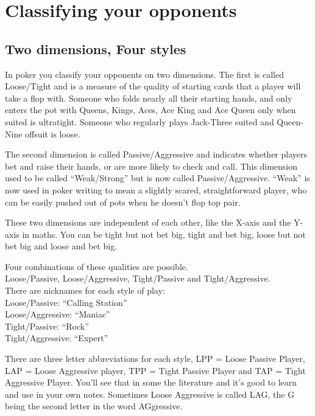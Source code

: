 \chapter{Classifying your opponents}


\section{Two dimensions, Four styles}

In poker you classify your opponents on two dimensions.
The first is called Loose/Tight and is a measure of the quality
of starting cards that a player will take a flop with. Someone
who folds nearly all their starting hands, and
only enters the pot with Queens, Kings, Aces, Ace King and
Ace Queen only when suited is ultratight. Someone who regularly plays
Jack-Three suited and Queen-Nine offsuit is loose.

The second dimension is called Passive/Aggressive and indicates
whether players bet and raise their hands, or are more likely
to check and call. This dimension used to be called ``Weak/Strong''
but is now called Passive/Aggressive. ``Weak'' is now used in poker
writing to mean a slightly scared, straightforward player, who can be
easily pushed out of pots when he doesn't flop top pair.

These two dimensions are independent of each other, like the X-axis
and the Y-axis in maths. You can be tight but not bet big, tight
and bet big, loose but not bet big and loose and bet big.


Four combinations of these qualities are possible. \\
Loose/Passive, Loose/Aggressive, Tight/Passive and Tight/Aggressive. \\
There are nicknames for each style of play: \\
Loose/Passive: ``Calling Station'' \\
Loose/Aggressive: ``Maniac'' \\
Tight/Passive: ``Rock'' \\
Tight/Aggressive: ``Expert''

There are three letter abbreviations for each style, LPP = Loose
Passive Player, LAP = Loose Aggressive player, TPP = Tight Passive
Player and TAP = Tight Aggressive Player. You'll see that in some the
literature and it's good to learn and use in your own notes. Sometimes
Loose Aggressive is called LAG, the G being the second letter in the
word AGgressive.

